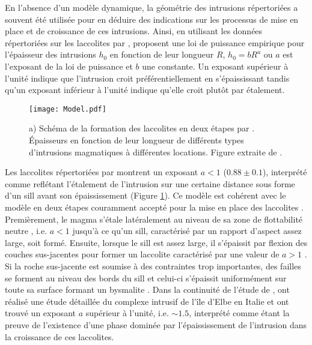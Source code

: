 En  l'absence  d'un  modèle  dynamique, la  géométrie  des  intrusions
répertoriées a  souvent été utilisée  pour en déduire  des indications
sur les processus de mise en place et de croissance de ces intrusions.
Ainsi, en  utilisant les données  répertoriées sur les  laccolites par
\citet{E:2015tl},  \citet{McCaffrey:1997ea}   proposent  une   loi  de
puissance empirique pour l'épaisseur  des intrusions $h_0$ en fonction
de leur longueur $R$, $h_0 = bR^a$  ou $a$ est l'exposant de la loi de
puissance  et $b$  une  constante.  Un  exposant  supérieur à  l'unité
indique  que l'intrusion  croit  préférentiellement en  s'épaississant
tandis qu'un exposant inférieur à l'unité indique qu'elle croit plutôt
par étalement.

\begin{figure}[htpb]
  \begin{center}
    \graphicspath{ {/Users/thorey/Documents/These/Manuscript/Figure/Chapter1/} }
    \texttt{[image: Model.pdf]}
    \caption{a) Schéma de  la formation des laccolites  en deux étapes
      par  \citet{McCaffrey:1997ea}.  Épaisseurs  en fonction  de leur
      longueur   de  différents   types  d'intrusions   magmatiques  à
      différentes locations.  Figure extraite de \citet{Cruden:tg}.}
    \label{C1-Model}
  \end{center}
\end{figure}

Les laccolites répertoriées par  \citet{E:2015tl} montrent un exposant
$a<1$  ($0.88 \pm  0.1$),  interprété comme  reflétant l'étalement  de
l'intrusion sur une  certaine distance sous forme d'un  sill avant son
épaississement (Figure \ref{C1-Model}). Ce modèle est cohérent avec le
modèle en  deux étapes couramment  accepté pour  la mise en  place des
laccolites \citep{Johnson:1973ho,McCaffrey:1997ea}.   Premièrement, le
magma s'étale latéralement au niveau de sa zone de flottabilité neutre
,  i.e.  $a<1$  jusqu'à  ce  qu'un sill,  caractérisé  par un  rapport
d'aspect assez large, soit formé.   Ensuite, lorsque le sill est assez
large, il s'épaissit par flexion  des couches sus-jacentes pour former
un    laccolite    caractérisé    par     une    valeur    de    $a>1$
\citep{Johnson:1973ho,Koch:1981if}.   Si  la   roche  sus-jacente  est
soumise à des contraintes trop  importantes, des failles se forment au
niveau des bords du sill et celui-ci s'épaissit uniformément sur toute
sa surface formant un  bysmalite \citep{E:2015tl}.  Dans la continuité
de  l'étude  de  \citet{McCaffrey:1997ea},  \citet{Rocchi:2002jy}  ont
réalisé une  étude détaillée du  complexe intrusif de l'île  d'Elbe en
Italie  et  ont trouvé  un  exposant  $a$  supérieur à  l'unité,  i.e.
$\sim  1.5$, interprété  comme étant  la preuve  de l'existence  d'une
phase dominée  par l'épaississement de l'intrusion  dans la croissance
de ces laccolites.

